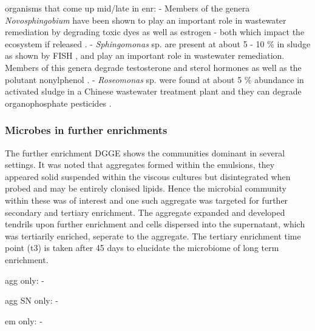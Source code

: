 \documentclass[11pt]{article}
\begin{document}
organisms that come up mid/late in enr:
- Members of the genera \emph{Novosphingobium} have been shown to play an important role in wastewater remediation by degrading toxic dyes as well as estrogen - both which impact the ecosystem if released \cite{addison2007novosphingobium,hashimoto2009contribution}.
- \emph{Sphingomonas} sp. are present at about 5 - 10 \% in sludge as shown by FISH \cite{neef1999detection}, and play an important role in wastewater remediation. Members of this genera degrade testosterone and sterol hormones as well as the polutant nonylphenol \cite{fujii2001sphingomonas,roh201017beta}.
- \emph{Roseomonas} sp. were found at about 5 \% abundance in activated sludge in a Chinese wastewater treatment plant and they can degrade organophosphate pesticides \cite{jiang2008bacterial,jiang2006isolation}.

\subsubsection{Microbes in further enrichments}
The further enrichment DGGE shows the communities dominant in several settings. It was noted that aggregates formed within the emulsions, they appeared solid suspended within the viscous cultures but disintegrated when probed and may be entirely clonised lipids. Hence the microbial community within these was of interest and one such aggregate was targeted for further secondary and tertiary enrichment. The aggregate expanded and developed tendrils upon further enrichment and    cells dispersed into the supernatant, which was tertiarily enriched, seperate to the aggregate. The tertiary enrichment time point (t3) is taken after 45 days to elucidate the microbiome of long term enrichment.

agg only:
-

agg SN only:
- 

em only:
-
\end{document}
